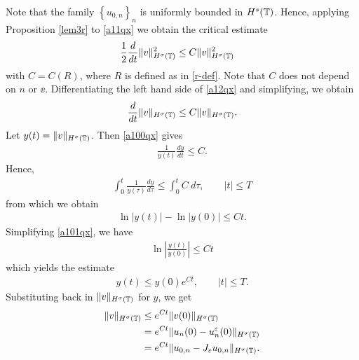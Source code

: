 Note that the family $\left\{ u_{0,n} \right\}_n$ is uniformly bounded in
$H^s(\mathbb{T})$. Hence, applying Proposition \ref{lem3r} to \eqref{a11qx} we obtain the critical estimate 
\begin{equation}
	\begin{split}
		\label{a12qx}
		\frac{1}{2}\frac{d}{dt} \|v\|_{H^{\sigma}(\mathbb{T})}^2
		& \le
	C \|v\|_{H^{\sigma}(\mathbb{T})}^2
\end{split}
\end{equation}
with $C = C(R)$, where $R$ is defined as in \eqref{r-def}. Note that $C$
does not depend on $n$ or $\ee$. Differentiating
the left hand side of \eqref{a12qx} and simplifying, we obtain
\begin{equation}
	\begin{split}
		\frac{d}{dt}\|v\|_{H^{\sigma}(\mathbb{T})} \le C \|v\|_{H^{\sigma}(\mathbb{T})}.
		\label{a100qx}
	\end{split}
\end{equation}
Let $y(t) = \|v\|_{H^{\sigma}(\mathbb{T})}$. Then \eqref{a100qx} gives
\begin{equation*}
	\begin{split}
		\frac{1}{y(t)}\frac{dy}{dt} \le C.
	\end{split}
\end{equation*}
Hence,
\begin{equation*}
	\begin{split}
		\int_0^t \frac{1}{y(\tau)} \frac{dy}{d \tau}
		\le \int_0^t C \ d \tau, \qquad |t| \le T
	\end{split}
\end{equation*}
from which we obtain
\begin{equation}
	\begin{split}
		\ln |y(t) | - \ln |y(0)| \le C t.
		\label{a101qx}
	\end{split}
\end{equation}
Simplifying \eqref{a101qx}, we have
\begin{equation*}
	\begin{split}
		\ln \left |\frac{y(t)}{y(0)} \right | \le C t
	\end{split}
\end{equation*}
which yields the estimate
\begin{equation*}
	\begin{split}
		y(t) \le y(0) e^{C t}, \qquad |t| \le T.
	\end{split}
\end{equation*}
Substituting back in $\|v\|_{H^{\sigma}(\mathbb{T})}$ for $y$, we get
\begin{equation}
	\label{vsig-est}
	\begin{split}
		\|v\|_{H^{\sigma}(\mathbb{T})}
		& \le e^{C t}\|v(0)\|_{H^{\sigma}(\mathbb{T})}
		\\
		& = e^{C t}\|u_n(0) - u^\varepsilon_n(0) \|_{H^{\sigma}(\mathbb{T})}
		\\
		& = e^{C t}\|u_{0,n} - J_\varepsilon u_{0,n}\|_{H^{\sigma}(\mathbb{T})}.
	\end{split}
\end{equation}
